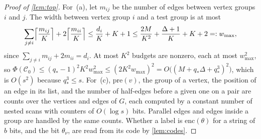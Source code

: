 \documentclass[11pt]{article}
\theoremstyle{definition}
\theoremstyle{definition}
\theoremstyle{remark}
\begin{document}
\begin{proof}[Proof of \cref{lem:top}]
For~(a), let $m_{ij}$ be the number of edges between vertex groups $i$ and $j$. The width between vertex group $i$ and a test group is at most
\[
\sum_{j\ne i}\Bigl\lceil\frac{m_{ij}}K\Bigr\rceil+2\Bigl\lceil\frac{m_{ii}}K\Bigr\rceil\le\frac{d_i}K+K+1\le\frac{2M}{K^2}+\frac{\Delta+1}K+K+2=:w_{\max},
\]
since $\sum_{j\ne i}m_{ij}+2m_{ii}=d_i$. At most $K^2$ budgets are nonzero, each at most $w_{\max}^2$, so $\Phi(\mathcal C_0)\le(q_*-1)^2K^2w_{\max}^2\le(2K^2w_{\max})^2=O\bigl((M+q_*\Delta+q_*^3)^2\bigr)$, which is $O(s^2)$ because $q_*^3\le s$. For~(c), $\mathrm{pre}(v)$, the group of a vertex, the position of an edge in its list, and the number of half-edges before a given one on a pair are counts over the vertices and edges of $G$, each computed by a constant number of nested scans with counters of $O(\log s)$ bits. Parallel edges and edges inside a group are handled by the same counts. Whether a label is $\mathrm{enc}(\theta)$ for a string of $b$ bits, and the bit $\theta_\nu$, are read from its code by \cref{lem:codes}.
\end{proof}
\end{document}

